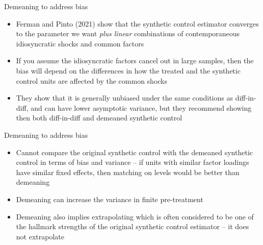 \documentclass{beamer}
\begin{document}
\begin{frame}{Demeaning to address bias}

\begin{itemize}
\item Ferman and Pinto (2021) show that the synthetic control estimator converges to the parameter we want \emph{plus linear} combinations of contemporaneous idiosyncratic shocks and common factors
\item If you assume the idiosyncratic factors cancel out in large samples, then the bias will depend on the differences in how the treated and the synthetic control units are affected by the common shocks
\item They show that it is generally unbiased under the same conditions as diff-in-diff, and can have lower asymptotic variance, but they recommend showing then both diff-in-diff and demeaned synthetic control

\end{itemize}

\end{frame}



\begin{frame}{Demeaning to address bias}

\begin{itemize}

\item Cannot compare the original synthetic control with the demeaned synthetic control in terms of bias and variance -- if units with similar factor loadings have similar fixed effects, then matching on levels would be better than demeaning 
\item Demeaning can increase the variance in finite pre-treatment
\item Demeaning also implies extrapolating which is often considered to be one of the hallmark strengths of the original synthetic control estimator -- it does not extrapolate 

\end{itemize}

\end{frame}
\end{document}
